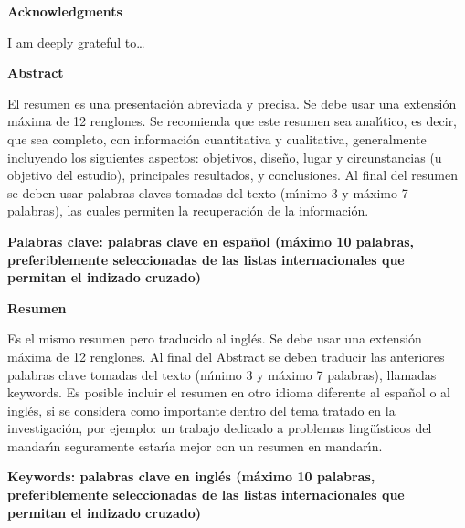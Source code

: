 \newpage{\pagestyle{empty}\cleardoublepage}

\newpage

\thispagestyle{empty}

\vspace*{1cm}

\textbf{\LARGE Acknowledgments}\vspace*{1.0cm}

I am deeply grateful to\ldots

\newpage{\pagestyle{empty}\cleardoublepage}

\newpage

\vspace*{1cm}

\textbf{\LARGE Abstract}\vspace*{1cm}

El resumen es una presentaci\'{o}n abreviada y precisa. Se debe usar una extensi\'{o}n m\'{a}xima de 12 renglones. Se recomienda que este resumen sea anal\'{\i}tico, es decir, que sea completo, con informaci\'{o}n cuantitativa y cualitativa, generalmente incluyendo los siguientes aspectos: objetivos, dise\~{n}o, lugar y circunstancias (u objetivo del estudio), principales resultados, y conclusiones. Al final del resumen se deben usar palabras claves tomadas del texto (m\'{\i}nimo 3 y m\'{a}ximo 7 palabras), las cuales permiten la recuperaci\'{o}n de la informaci\'{o}n.\vspace*{0.5cm}

\textbf{\small Palabras clave: palabras clave en espa\~{n}ol (m\'{a}ximo 10 palabras, preferiblemente seleccionadas de las listas internacionales que permitan el indizado cruzado)}\vspace*{1cm}

\textbf{\LARGE Resumen}\vspace*{1cm}

Es el mismo resumen pero traducido al ingl\'{e}s. Se debe usar una extensi\'{o}n m\'{a}xima de 12 renglones. Al final del Abstract se deben traducir las anteriores palabras clave tomadas del texto (m\'{\i}nimo 3 y m\'{a}ximo 7 palabras), llamadas keywords. Es posible incluir el resumen en otro idioma diferente al espa\~{n}ol o al ingl\'{e}s, si se considera como importante dentro del tema tratado en la investigaci\'{o}n, por ejemplo: un trabajo dedicado a problemas ling\"{u}\'{\i}sticos del mandar\'{\i}n seguramente estar\'{\i}a mejor con un resumen en mandar\'{\i}n.\vspace*{0.5cm}

\textbf{\small Keywords: palabras clave en ingl\'{e}s (m\'{a}ximo 10 palabras, preferiblemente seleccionadas de las listas internacionales que permitan el indizado cruzado)}

\newpage{\pagestyle{empty}\cleardoublepage}